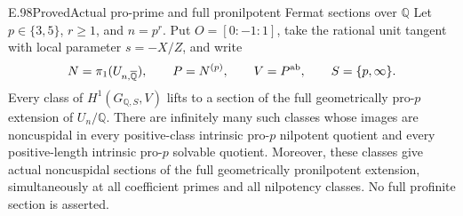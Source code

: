 \begin{result}{E.98}{Proved}{Actual pro-prime and full pronilpotent Fermat sections over \(\mathbb Q\)}
Let \(p\in\{3,5\}\), \(r\geq1\), and \(n=p^r\).  Put
\(O=[0:-1:1]\), take the rational unit tangent with local parameter
\(s=-X/Z\), and write
\[
 N=\pi_1(U_{n,\overline{\mathbb Q}}),\qquad
 P=N^{(p)},\qquad V=P^{\rm ab},\qquad S=\{p,\infty\}.
\]
Every class of \(H^1(G_{\mathbb Q,S},V)\) lifts to a section of the
full geometrically pro-\(p\) extension of \(U_n/\mathbb Q\).
There are infinitely many such classes whose images are noncuspidal
in every positive-class intrinsic pro-\(p\) nilpotent quotient and
every positive-length intrinsic pro-\(p\) solvable quotient.
Moreover, these classes give actual noncuspidal sections of the full
geometrically pronilpotent extension, simultaneously at all coefficient
primes and all nilpotency classes.  No full profinite section is asserted.
\end{result}
